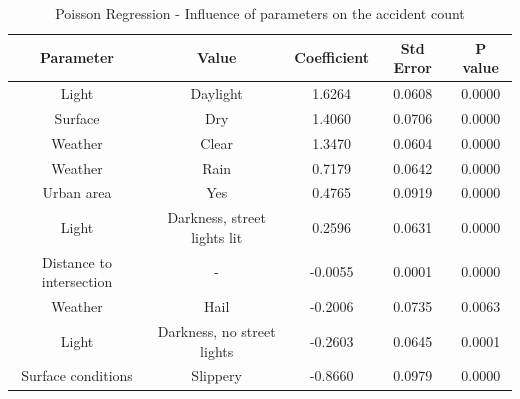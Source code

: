\begin{table}[h]
\centering
\begin{tabular}{|c|c|c|c|c|}
\hline
\textbf{Parameter}       & \textbf{Value}              & \textbf{Coefficient} & \textbf{Std Error} & \textbf{P value} \\ \hline
Light                    & Daylight                    & 1.6264               & 0.0608             & 0.0000           \\ \hline
Surface                  & Dry                         & 1.4060               & 0.0706             & 0.0000           \\ \hline
Weather                  & Clear                       & 1.3470               & 0.0604             & 0.0000           \\ \hline
Weather                  & Rain                        & 0.7179               & 0.0642             & 0.0000           \\ \hline
Urban area               & Yes                         & 0.4765               & 0.0919             & 0.0000           \\ \hline
Light                    & Darkness, street lights lit & 0.2596               & 0.0631             & 0.0000           \\ \hline
Distance to intersection & -                           & -0.0055              & 0.0001             & 0.0000           \\ \hline
Weather                  & Hail                        & -0.2006              & 0.0735             & 0.0063           \\ \hline
Light                    & Darkness, no street lights  & -0.2603              & 0.0645             & 0.0001           \\ \hline
Surface conditions       & Slippery                    & -0.8660              & 0.0979             & 0.0000           \\ \hline
\end{tabular}
\captionsetup{justification=centering}
\caption{Poisson Regression - Influence of parameters on the accident count}
\label{tab:regression}
\end{table}

